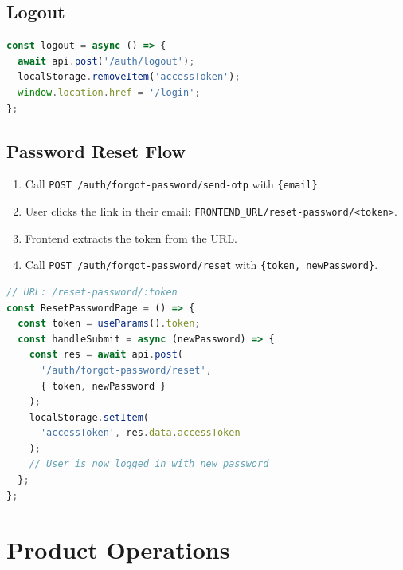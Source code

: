 \subsection{Logout}
\begin{lstlisting}[language=JavaScript]
const logout = async () => {
  await api.post('/auth/logout');
  localStorage.removeItem('accessToken');
  window.location.href = '/login';
};
\end{lstlisting}

\subsection{Password Reset Flow}
\begin{enumerate}
  \item Call \texttt{POST /auth/forgot-password/send-otp} with \texttt{\{email\}}.
  \item User clicks the link in their email: \texttt{FRONTEND\_URL/reset-password/<token>}.
  \item Frontend extracts the token from the URL.
  \item Call \texttt{POST /auth/forgot-password/reset} with \texttt{\{token, newPassword\}}.
\end{enumerate}

\begin{lstlisting}[language=JavaScript,title=Reset Password Page]
// URL: /reset-password/:token
const ResetPasswordPage = () => {
  const token = useParams().token;
  const handleSubmit = async (newPassword) => {
    const res = await api.post(
      '/auth/forgot-password/reset',
      { token, newPassword }
    );
    localStorage.setItem(
      'accessToken', res.data.accessToken
    );
    // User is now logged in with new password
  };
};
\end{lstlisting}

\section{Product Operations}

